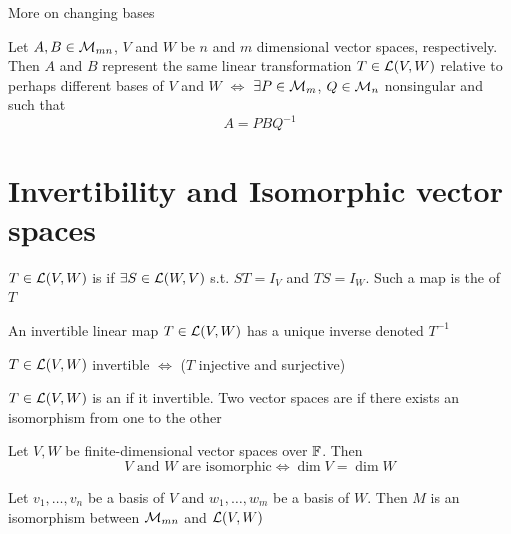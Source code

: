 \documentclass[aspectratio=169]{beamer}
\begin{document}
\begin{frame}{More on changing bases}
    \begin{theorem}
        Let $A,B\in\mathcal{M}_{mn}$, $V$ and $W$ be $n$ and $m$ dimensional vector spaces, respectively. Then $A$ and $B$ represent the same linear transformation $T\in\mathcal{L}(V,W)$ relative to perhaps different bases of $V$ and $W$ $\iff$ $\exists P\in\mathcal{M}_m$, $Q\in\mathcal{M}_n$ nonsingular and such that
        \[
        A=PBQ^{-1}
        \]
    \end{theorem}
\end{frame}


\section{Invertibility and Isomorphic vector spaces}


\begin{frame}
\begin{definition}
$T\in\mathcal{L}(V,W)$ is  if $\exists S\in\mathcal{L}(W,V)$ s.t. $ST=I_V$ and $TS=I_W$. Such a map is the  of $T$
\end{definition}

\begin{importanttheorem}
An invertible linear map $T\in\mathcal{L}(V,W)$ has a unique inverse denoted $T^{-1}$
\end{importanttheorem}

\begin{importanttheorem}
$T\in\mathcal{L}(V,W)$ invertible $\Leftrightarrow$ ($T$ injective and surjective)
\end{importanttheorem}
\end{frame}


\begin{frame}
\begin{definition}
$T\in\mathcal{L}(V,W)$ is an  if it invertible. Two vector spaces are  if there exists an isomorphism from one to the other
\end{definition}

\begin{importanttheorem}
Let $V,W$ be finite-dimensional vector spaces over $\mathbb{F}$. Then 
\[
V \textrm{ and } W \textrm{ are isomorphic}
\Leftrightarrow \dim V=\dim W
\]
\end{importanttheorem}

\begin{theorem}
Let $v_1,\ldots,v_n$ be a basis of $V$ and $w_1,\ldots,w_m$ be a basis of $W$. Then $M$ is an isomorphism between $\mathcal{M}_{mn}$ and $\mathcal{L}(V,W)$
\end{theorem}
\end{frame}
\end{document}
